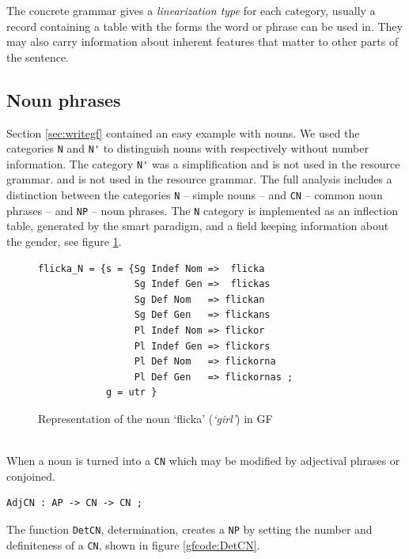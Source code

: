 \documentclass{report}
\begin{document}
The concrete grammar gives a \textit{linearization type} for each category,
usually a record containing a table with the forms the word or phrase can be used in.
They may also
carry information about inherent features that matter to other parts of the sentence.

           
\newpage
\subsection{Noun phrases}
Section \ref{sec:writegf} contained an easy example with nouns. We used the categories \verb-N-
and \verb-N'- to distinguish nouns with respectively without number information.
The category \verb-N'- was a simplification and is not used in the resource grammar. and is not used in the resource grammar.
The full analysis includes a distinction between the categories \verb-N- -- simple nouns --
and 
\verb-CN- -- common noun phrases -- and \verb-NP- -- noun phrases.
The \verb-N- category is implemented as an inflection table, generated by the smart paradigm,
and a field keeping information about the gender, see figure \ref{fig:gfflicka}.
\begin{figure}[h]
\begin{verbatim}
flicka_N = {s = {Sg Indef Nom =>  flicka
                 Sg Indef Gen =>  flickas
                 Sg Def Nom   => flickan
                 Sg Def Gen   => flickans
                 Pl Indef Nom => flickor
                 Pl Indef Gen => flickors
                 Pl Def Nom   => flickorna
                 Pl Def Gen   => flickornas ;
            g = utr }
\end{verbatim}
\caption{Representation of the noun `flicka' (\emph{`girl'}) in GF}
\label{fig:gfflicka}
\end{figure}\\
When a noun is turned into a \verb-CN- %
which may be modified by adjectival phrases or conjoined.
\begin{verbatim}
AdjCN : AP -> CN -> CN ; 
\end{verbatim}
The function \verb-DetCN-, determination, creates a
\verb-NP- by setting the number and definiteness of a \verb-CN-, shown in figure
\ref{gfcode:DetCN}.
\end{document}
